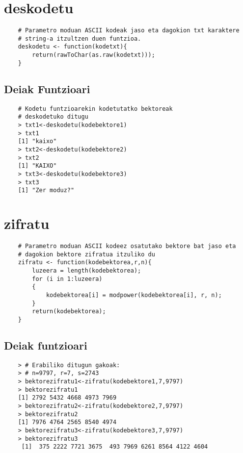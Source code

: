 \documentclass[12pt]{basque-book}
\begin{document}
\section{deskodetu}
\begin{verbatim}
    # Parametro moduan ASCII kodeak jaso eta dagokion txt karaktere 
    # string-a itzultzen duen funtzioa.
    deskodetu <- function(kodetxt){
        return(rawToChar(as.raw(kodetxt)));
    }   
\end{verbatim}

\subsection{Deiak Funtzioari}
\begin{verbatim}
    # Kodetu funtzioarekin kodetutatko bektoreak 
    # deskodetuko ditugu
    > txt1<-deskodetu(kodebektore1)
    > txt1
    [1] "kaixo"
    > txt2<-deskodetu(kodebektore2)
    > txt2
    [1] "KAIXO"
    > txt3<-deskodetu(kodebektore3)
    > txt3
    [1] "Zer moduz?"
\end{verbatim}

\newpage

\section{zifratu}
\begin{verbatim}
    # Parametro moduan ASCII kodeez osatutako bektore bat jaso eta 
    # dagokion bektore zifratua itzuliko du
    zifratu <- function(kodebektorea,r,n){
        luzeera = length(kodebektorea);
        for (i in 1:luzeera)
        {
            kodebektorea[i] = modpower(kodebektorea[i], r, n);
        }
        return(kodebektorea);
    }
\end{verbatim}

\subsection{Deiak funtzioari}
\begin{verbatim}
    > # Erabiliko ditugun gakoak:
    > # n=9797, r=7, s=2743
    > bektorezifratu1<-zifratu(kodebektore1,7,9797)
    > bektorezifratu1
    [1] 2792 5432 4668 4973 7969
    > bektorezifratu2<-zifratu(kodebektore2,7,9797)
    > bektorezifratu2
    [1] 7976 4764 2565 8540 4974
    > bektorezifratu3<-zifratu(kodebektore3,7,9797)
    > bektorezifratu3
     [1]  375 2222 7721 3675  493 7969 6261 8564 4122 4604
\end{verbatim}
\end{document}
